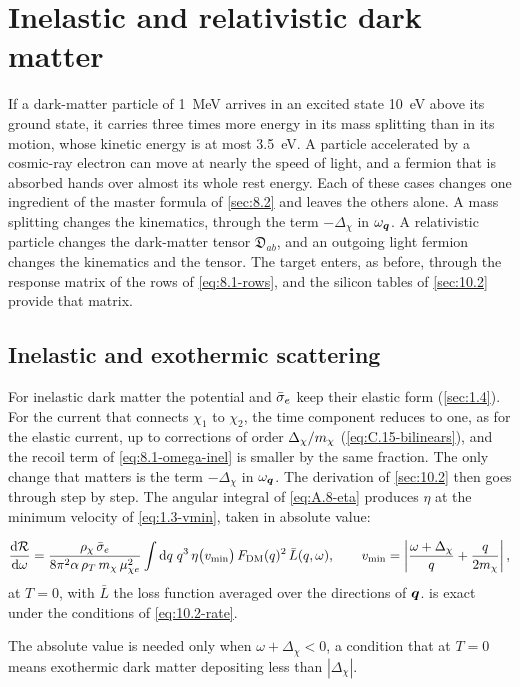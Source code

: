 \section{Inelastic and relativistic dark matter}\label{sec:10.9}

If a dark-matter particle of \SI{1}{MeV} arrives in an excited state \SI{10}{eV} above its ground state, it carries three times more energy in its mass splitting than in its motion, whose kinetic energy is at most \SI{3.5}{eV}. A particle accelerated by a cosmic-ray electron can move at nearly the speed of light, and a fermion that is absorbed hands over almost its whole rest energy. Each of these cases changes one ingredient of the master formula of \cref{sec:8.2} and leaves the others alone. A mass splitting changes the kinematics, through the term $-\Delta_\chi$ in $\omega_{\bm{q}}$. A relativistic particle changes the dark-matter tensor $\mathfrak{D}_{ab}$, and an outgoing light fermion changes the kinematics and the tensor. The target enters, as before, through the response matrix of the rows of \cref{eq:8.1-rows}, and the silicon tables of \cref{sec:10.2} provide that matrix.

\subsection{Inelastic and exothermic scattering}\label{sec:10.9-inelastic}

For inelastic dark matter the potential and $\bar{\sigma}_{e}$ keep their elastic form (\cref{sec:1.4}). For the current that connects $\chi_1$ to $\chi_2$, the time component reduces to one, as for the elastic current, up to corrections of order $\Delta_\chi/m_{\chi}$ (\cref{eq:C.15-bilinears}), and the recoil term of \cref{eq:8.1-omega-inel} is smaller by the same fraction. The only change that matters is the term $-\Delta_\chi$ in $\omega_{\bm{q}}$. The derivation of \cref{sec:10.2} then goes through step by step. The angular integral of \cref{eq:A.8-eta} produces $\eta$ at the minimum velocity of \cref{eq:1.3-vmin}, taken in absolute value:
\begin{keyresult}
\begin{equation}
  \frac{\mathrm{d}\mathcal{R}}{\mathrm{d}\omega} = \frac{\rho_\chi\,\bar{\sigma}_{e}}{8\pi^2\alpha\,\rho_T\,m_{\chi}\,\mu_{\chi e}^2}\int\mathrm{d} q\;q^3\,\eta\bigl(v_{\mathrm{min}}\bigr)\,F_{\mathrm{DM}}(q)^2\,\bar L(q,\omega) , \qquad
  v_{\mathrm{min}} = \left|\frac{\omega + \Delta_\chi}{q} + \frac{q}{2m_{\chi}}\right| ,
  \label{eq:10.9-inel}
\end{equation}
at $T = 0$, with $\bar L$ the loss function averaged over the directions of $\bm{q}$.  is exact under the conditions of \cref{eq:10.2-rate}.
\end{keyresult}
\noindent The absolute value is needed only when $\omega + \Delta_\chi < 0$, a condition that at $T = 0$ means exothermic dark matter depositing less than $|\Delta_\chi|$.

